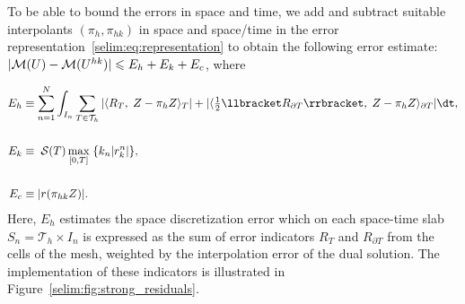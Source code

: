 To be able to bound the errors in space and time, we
add and subtract suitable interpolants $(\pi_h, \pi_{hk})$ in space
and space/time in the error
representation~\eqref{selim:eq:representation} to obtain the following
\apost{} error estimate: $|\mathcal{M}(U) - \mathcal{M}(U^{hk})| \leqslant  E_h +
E_k + E_c$, where

\begin{equation}
\label{selim:eq:aposteriori}
\begin{split}
E_h &\equiv \sum_{n=1}^{N}\int_{I_n} \sum_{T\in\mathcal{T}_h}| \langle
R_T,\; Z - \pi_h Z \rangle_T |+ | \langle \tfrac{1}{2}\llbracket R_{\partial T}
\rrbracket,\; Z - \pi_h Z \rangle _{\partial T}|\dt,\\\\ E_k &\equiv
\;\mathcal{S}(T)\max_{[0,T]}\;\{k_n | r_k ^n|\},\\\\ E_c &\equiv
|r(\pi_{hk}Z)|.
\end{split}
\end{equation}
Here, $E_h$ estimates the space discretization error which on each
space-time slab $S_n = \mathcal{T}_h \times I_n$ is expressed as the sum
of error indicators $R_T$ and $R_{\partial T}$ from the cells of the
mesh, weighted by the interpolation error of the dual solution. The
implementation of these indicators is illustrated in Figure~\ref{selim:fig:strong_residuals}.

